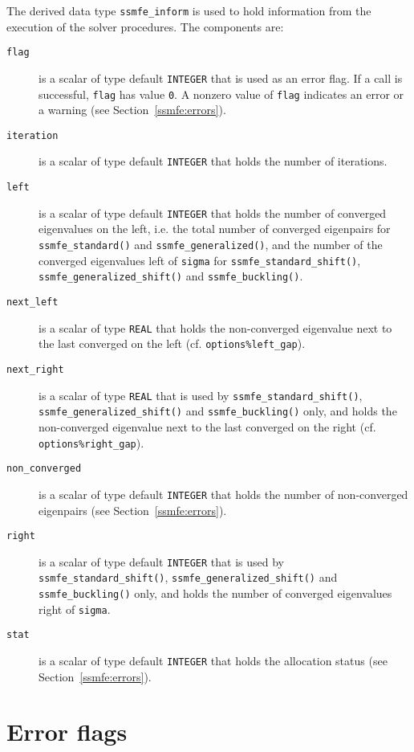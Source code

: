 \label{ssmfe:type:inform}

The derived data type {\tt ssmfe\_inform} is used
to hold information from the execution of
the solver procedures.
The components are:

\begin{description}
%
\item[\texttt{flag}] is a scalar of type default {\tt INTEGER} 
that is used as an error flag.
If a call is successful, {\tt flag} has value {\tt 0}.
A nonzero value of {\tt flag} indicates an error or a warning
(see Section~\ref{ssmfe:errors}).
%
\item[\texttt{iteration}] is a scalar of type default {\tt INTEGER} that holds 
the number of iterations.
%
\item[\texttt{left}]
is a scalar of type default {\tt INTEGER} that holds
the number of converged eigenvalues on the left,
i.e. the total number of converged eigenpairs for 
{\tt ssmfe\_standard()} and {\tt ssmfe\_generalized()},
and the number of the converged eigenvalues left of {\tt sigma}
for {\tt ssmfe\_standard\_shift()}, {\tt ssmfe\_generalized\_shift()}
and {\tt ssmfe\_buckling()}.
%
\item[\texttt{next\_left}]
is a scalar of type \texttt{REAL} that holds
the non-converged eigenvalue next to the last converged on the left
(cf. {\tt options\%left\_gap}).
%
\item[\texttt{next\_right}]
is a scalar of type \texttt{REAL} that is used by
{\tt ssmfe\_standard\_shift()}, {\tt ssmfe\_generalized\_shift()}
and {\tt ssmfe\_buckling()} only, and holds
the non-converged eigenvalue next to the last converged on the right
(cf. {\tt options\%right\_gap}).
%
\item[\texttt{non\_converged}]
is a scalar of type default \texttt{INTEGER}
that holds the number of non-converged eigenpairs
(see Section~\ref{ssmfe:errors}).
%
\item[\texttt{right}]
is a scalar of type default {\tt INTEGER} that is used by 
{\tt ssmfe\_standard\_shift()}, {\tt ssmfe\_generalized\_shift()}
and {\tt ssmfe\_buckling()} only, and holds
the number of converged eigenvalues right of {\tt sigma}.
%
\item[\texttt{stat}]
is a scalar of type default \texttt{INTEGER}
that holds the allocation status
(see Section~\ref{ssmfe:errors}).
%
\end{description}

\section{Error flags}


